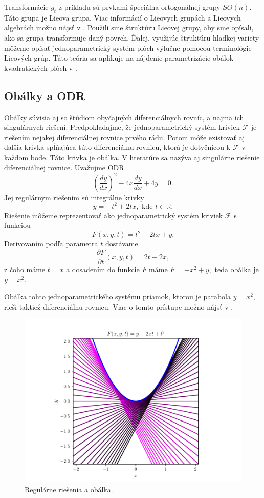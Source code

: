 Transformácie $g_{t}$ z príkladu sú prvkami špeciálna ortogonálnej grupy $SO(n)$. Táto grupa je Lieova grupa. Viac informácií o Lieovych grupách a Lieovych algebrách možno nájsť v \cite{Lee12}.
Použili sme štruktúru Lieovej grupy, aby sme opísali, ako sa grupa transformuje daný povrch. Ďalej, využijúc štruktúru hladkej variety môžeme opísať jednoparametrický systém plôch výlučne pomocou terminológie Lieových grúp. Táto teória sa aplikuje na nájdenie parametrizácie obálok kvadratických plôch v \cite{Vra22}. 

\subsection{Obálky a ODR}
Obálky súvisia aj so štúdiom obyčajných diferenciálnych rovníc, a najmä ich singulárnych riešení. Predpokladajme, že jednoparametrický systém kriviek $\mathcal{F}$ je riešením nejakej diferenciálnej rovnice prvého rádu. Potom môže existovať aj ďalšia krivka spĺňajúca túto diferenciálnu rovnicu, ktorá je dotyčnicou k $\mathcal{F}$ v každom bode. Táto krivka je obálka. V literatúre sa nazýva aj singulárne riešenie diferenciálnej rovnice.
Uvažujme ODR 
$$
\left(\frac{dy}{dx}\right)^2 - 4x\frac{dy}{dx} + 4y = 0.
$$
Jej regulárnym riešením sú integrálne krivky 
$$ y = - t^2 + 2tx, \text{ kde } t \in \mathbb{R}.$$
Riešenie môžeme reprezentovať ako jednoparametrický systém kriviek $\mathcal{F}$ s funkciou
$$F(x,y,t) = t^2 - 2tx + y. $$
Derivovaním podľa parametra $t$ dostávame
$$\dfrac{\partial F}{\partial t} (x,y,t) = 2t - 2x, $$
z čoho máme $t=x$ a dosadením do funkcie $F$ máme $F=-x^2+y,$ teda obálka je $y=x^2.$

Obálka tohto jednoparametrického systému priamok, ktorou je parabola $y = x^2$, rieši taktiež diferenciálnu rovnicu. Viac o tomto prístupe možno nájsť v \cite{Gro97}.

\begin{figure}[h]
	\centering
	\includegraphics[trim={0 0.35cm 0 0.85cm},clip]{images/odr.pdf}
	\caption{Regulárne riešenia a obálka.}
	\label{fig:odr}
\end{figure}


